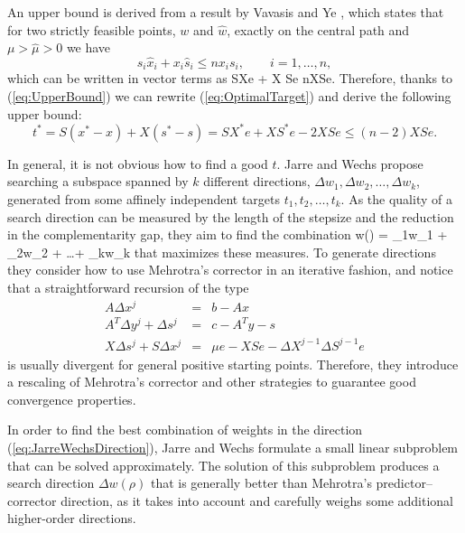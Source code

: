 
An upper bound is derived from a result by Vavasis and Ye 
\cite[Lemma~16]{VavasisYe}, which states that for two 
strictly feasible points, $w$ and $\hat w$, exactly on the central path
and $\mu > \hat\mu > 0$ we have
\[
  s_i \hat x_i + x_i \hat s_i \le n x_i s_i, \qquad i = 1, \ldots, n,
\]
which can be written in vector terms as
\be  \label{eq:UpperBound}
  S\hat Xe + X \hat Se \le nXSe.
\ee
Therefore, thanks to (\ref{eq:UpperBound}) 
we can rewrite (\ref{eq:OptimalTarget}) and derive the following upper bound:
\[
  t^*= S(x^*-x) + X(s^*-s) = SX^*e + XS^*e -2XSe \le (n-2) XSe.
\]

In general, it is not obvious how to find a good $t$.
Jarre and Wechs \cite{JarreWechs} 
propose searching a subspace spanned by $k$ different 
directions, $\Delta w_1, \Delta w_2, \ldots, \Delta w_k$, generated 
from some affinely independent targets $t_1,t_2,\ldots,t_k$.
As the quality of a search direction can be measured by the length 
of the stepsize and the reduction in the complementarity gap, they aim 
to find the combination 
\be  \label{eq:JarreWechsDirection}
\Delta w(\rho) 
         = \rho_1\Delta w_1 + \rho_2\Delta w_2 + \ldots + \rho_k\Delta w_k
\ee
that maximizes these measures.
To generate directions they consider how to use Mehrotra's corrector 
in an iterative 
fashion, and notice that a straightforward recursion of the type
\begin{eqnarray*}
  A\Delta x^j &=& b-Ax \\
  A^T\Delta y^j +\Delta s^j &=& c-A^Ty-s \\
  X\Delta s^j + S\Delta x^j &=& \mu e  -XSe -\Delta X^{j-1}\Delta S^{j-1}e
\end{eqnarray*}
is usually divergent for general positive starting points.
Therefore, they introduce a rescaling of Mehrotra's corrector 
and other strategies to guarantee good convergence properties.

In order to find the best combination of weights in the direction 
(\ref{eq:JarreWechsDirection}), Jarre and Wechs \cite{JarreWechs} 
formulate a small linear subproblem that can 
be solved approximately. The solution of this subproblem 
produces a search direction $\Delta w(\rho)$ 
that is generally better than Mehrotra's predictor--corrector
direction, as it takes into account and carefully weighs some
additional higher-order directions.

